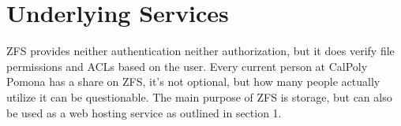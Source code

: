 \section{Underlying Services}

ZFS provides neither authentication neither authorization, but it does verify file permissions and ACLs based on the user. Every current person at CalPoly Pomona has a share on ZFS, it's not optional, but how many people actually utilize it can be questionable. The main purpose of ZFS is storage, but can also be used as a web hosting service as outlined in section 1. 
